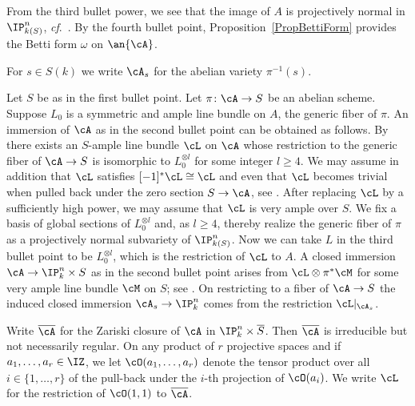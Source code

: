 From the third bullet power, we see that the image of $A$ is
projectively normal in $\IP_{k(S)}^n$, \textit{cf}.~\cite[Theorem 9]{Mumford:quadeq}. By the fourth bullet point,
Proposition~\ref{PropBettiForm} provides the Betti form $\omega$ on
$\an{\cA}$.


For $s\in S(k)$ we write $\cA_s$ for the abelian variety $\pi^{-1}(s)$.

\begin{remark}
\notready
\label{rmk:projembedding}
Let $S$ be as in the first bullet point. %
Let
$\pi \colon \cA \rightarrow S$ be an abelian scheme.
Suppose $L_0$ is a
symmetric and ample line bundle on $A$, the generic fiber of $\pi$.
An immersion of $\cA$ as in the second bullet point can  be obtained
as follows.
 By \cite[Th\'eor\`eme~XI~1.13]{LNM119}  there exists an
$S$-ample line bundle $\cL$ on $\cA$ whose restriction to the
generic fiber of $\cA\rightarrow S$ is isomorphic to $L_0^{\otimes l}$
for some integer $l\ge 4$.
We may assume in addition that $\cL$
satisfies
$[-1]^* \cL \cong \cL$ and even that $\cL$ becomes trivial when pulled back under the
zero section $S\rightarrow \cA$, see \cite[Remarque~XI~1.3a]{LNM119}.
After replacing $\cL$
by  a sufficiently high power, we may assume that $\cL$ is very ample over
$S$.
We fix a basis of global sections of $L_0^{\otimes l}$ and, as $l\ge
4$, thereby
realize the
 generic fiber of $\pi$ as a projectively normal subvariety of
$\IP_{k(S)}^n$.
Now we can take $L$ in the third bullet point to be $L_0^{\otimes l}$,
which is the restriction of $\cL$ to $A$.
A closed immersion $\cA \rightarrow \IP^n_k \times S$ as in the second
bullet point %
 arises from
$\cL \otimes \pi^*\cM$ for some very ample line bundle $\cM$ on $S$; see \cite[Proposition~4.4.10.(ii) and Proposition~4.1.4]{EGAII}.
On restricting to a fiber of $\cA\rightarrow S$ the induced closed immersion  $\cA_s\rightarrow\IP^n_k$ comes from the restriction $\cL|_{\cA_s}$.
\end{remark}


Write $\overline \cA$ for the Zariski closure
of $\cA$ in $\IP_k^n\times \overline{S}$. Then $\overline \cA$ is irreducible
but not necessarily regular.
On any product of $r$ projective spaces and if $a_1,\ldots,a_r\in\IZ$,
we let  $\cO(a_1,\ldots,a_r)$ denote the tensor product over all $i\in
\{1,\ldots, r\}$ of the
pull-back under the $i$-th projection of $\cO(a_i)$.
We write $\cL$ for the restriction of $\cO(1,1)$ to $\overline{\cA}$.

